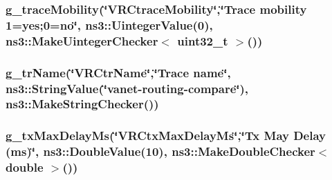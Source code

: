 \subsubsection[{\texorpdfstring{g\+\_\+trace\+Mobility}{g_traceMobility}}]{ g\+\_\+trace\+Mobility(\char`\"{}V\+R\+Ctrace\+Mobility\char`\"{},\char`\"{}Trace mobility 1=yes;0=no\char`\"{}, ns3\+::\+Uinteger\+Value(0), {\bf ns3\+::\+Make\+Uinteger\+Checker}$<$ uint32\+\_\+t $>$())\hspace{0.3cm}{\ttfamily [static]}}\hypertarget{vanet-routing-compare_8cc_aa579c762a1772e281a229e564f28200e}{}\label{vanet-routing-compare_8cc_aa579c762a1772e281a229e564f28200e}
\subsubsection[{\texorpdfstring{g\+\_\+tr\+Name}{g_trName}}]{ g\+\_\+tr\+Name(\char`\"{}V\+R\+Ctr\+Name\char`\"{},\char`\"{}Trace {\bf name}\char`\"{}, ns3\+::\+String\+Value(\char`\"{}vanet-\/routing-\/compare\char`\"{}), ns3\+::\+Make\+String\+Checker())\hspace{0.3cm}{\ttfamily [static]}}\hypertarget{vanet-routing-compare_8cc_a3df9cac28d4bc68e6e6ab992279c6043}{}\label{vanet-routing-compare_8cc_a3df9cac28d4bc68e6e6ab992279c6043}
\subsubsection[{\texorpdfstring{g\+\_\+tx\+Max\+Delay\+Ms}{g_txMaxDelayMs}}]{ g\+\_\+tx\+Max\+Delay\+Ms(\char`\"{}V\+R\+Ctx\+Max\+Delay\+Ms\char`\"{},\char`\"{}Tx May Delay (ms)\char`\"{}, ns3\+::\+Double\+Value(10), {\bf ns3\+::\+Make\+Double\+Checker}$<$ double $>$())\hspace{0.3cm}{\ttfamily [static]}}\hypertarget{vanet-routing-compare_8cc_a309f830b17d86d0b16859c64e952567e}{}\label{vanet-routing-compare_8cc_a309f830b17d86d0b16859c64e952567e}
